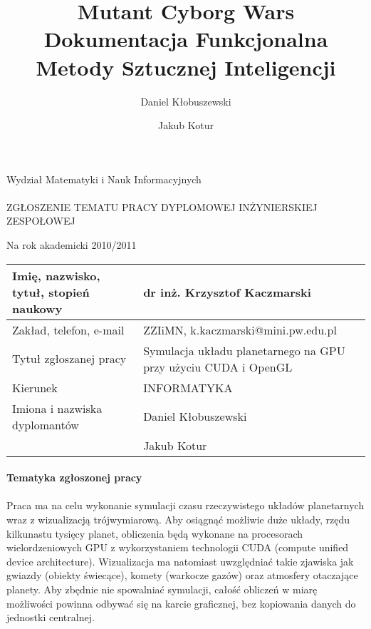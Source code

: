 \documentclass[a4paper,titlepage,10pt]{article}
\title{\huge Mutant Cyborg Wars \\\large Dokumentacja Funkcjonalna\\\small Metody Sztucznej Inteligencji }
\author{Daniel Kłobuszewski\and Jakub Kotur}
\begin{document}
	\paragraph{}

	Wydział Matematyki i Nauk Informacyjnych

	\paragraph{}
	\begin{center}
	ZGŁOSZENIE TEMATU PRACY DYPLOMOWEJ INŻYNIERSKIEJ ZESPOŁOWEJ

	Na rok akademicki 2010/2011
	\end{center}

	\begin{tabular}{ | l | p{} | }
	\hline
	Imię, nazwisko, tytuł, stopień naukowy & dr inż. Krzysztof Kaczmarski \\ \hline
	Zakład, telefon, e-mail & ZZIiMN, k.kaczmarski@mini.pw.edu.pl \\\hline
	Tytuł zgłoszanej pracy & Symulacja układu planetarnego na GPU przy użyciu CUDA i OpenGL \\\hline
	Kierunek & INFORMATYKA \\\hline
	Imiona i nazwiska dyplomantów & Daniel Kłobuszewski\\
	& Jakub Kotur \\\hline
	\end{tabular}

	\paragraph{Tematyka zgłoszonej pracy}

	\paragraph{}

	Praca ma na celu wykonanie symulacji czasu rzeczywistego układów planetarnych wraz z wizualizacją trójwymiarową. Aby osiągnąć możliwie duże układy, rzędu kilkunastu tysięcy planet, obliczenia będą wykonane na procesorach wielordzeniowych GPU z wykorzystaniem technologii CUDA (compute unified device architecture). Wizualizacja ma natomiast uwzględniać takie zjawiska jak gwiazdy (obiekty świecące), komety (warkocze gazów) oraz atmosfery otaczające planety. Aby zbędnie nie spowalniać symulacji, całość obliczeń w miarę możliwości powinna odbywać się na karcie graficznej, bez kopiowania danych do jednostki centralnej.
\end{document}
